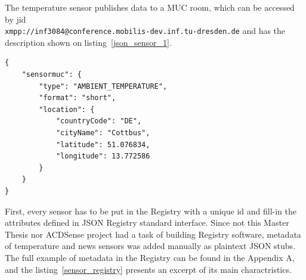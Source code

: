 The temperature sensor publishes data to a MUC room, which can be accessed by jid\\ \verb|xmpp://inf3084@conference.mobilis-dev.inf.tu-dresden.de| and has the description shown on listing~\ref{json_sensor_1}.

	\begin{lstlisting}[label=json_sensor_1,caption=JSON Description of Temperature Sensor]
{
    "sensormuc": {
        "type": "AMBIENT_TEMPERATURE",
        "format": "short",
        "location": {
            "countryCode": "DE",
            "cityName": "Cottbus",
            "latitude": 51.076834,
            "longitude": 13.772586
        }
    }
}
	\end{lstlisting}

First, every sensor has to be put in the Registry with a unique id and fill-in the attributes defined in JSON Registry standard interface. Since not this Master Thesis nor ACDSense project had a task of building Registry software, metadata of temperature and news sensors was added manually as plaintext JSON stubs. The full example of metadata in the Registry can be found in the Appendix A, and the listing~\ref{sensor_registry} presents an excerpt of its main charactristics.

